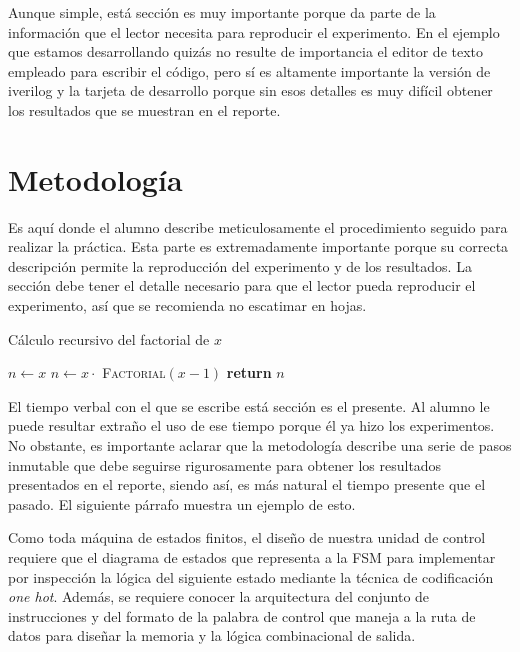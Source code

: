 \documentclass[11pt, twocolumn]{article}
\begin{document}
Aunque simple, está sección es muy importante porque da parte de la información que el lector necesita para reproducir el experimento. En el ejemplo que estamos desarrollando quizás no resulte de importancia el editor de texto empleado para escribir el código, pero sí es altamente importante la versión de iverilog y la tarjeta de desarrollo porque sin esos detalles es muy difícil obtener los resultados que se muestran en el reporte.

\section{Metodología}\label{sec:methodology}

Es aquí donde el alumno describe meticulosamente el procedimiento seguido para realizar la práctica. Esta parte es extremadamente importante porque su correcta descripción permite la reproducción del experimento y de los resultados. La sección debe tener el detalle necesario para que el lector pueda reproducir el experimento, así que se recomienda no escatimar en hojas.

\begin{center}
    \begin{minipage}{0.4\textwidth}
        \begin{algorithm}[H]
            \caption{Cálculo recursivo del factorial de $x$}\label{alg:factorial}
            \begin{algorithmic}[1]
                    \State $n \gets x$
                \Else
                    \State $n \gets x \cdot $ \textsc{Factorial}$(x-1)$
                \EndIf
                \State \textbf{return} $n$
                \EndProcedure
            \end{algorithmic}
        \end{algorithm}
    \end{minipage}
\end{center}

El tiempo verbal con el que se escribe está sección es el presente. Al alumno le puede resultar extraño el uso de ese tiempo porque él ya hizo los experimentos. No obstante, es importante aclarar que la metodología describe una serie de pasos inmutable que debe seguirse rigurosamente para obtener los resultados presentados en el reporte, siendo así, es más natural el tiempo presente que el pasado. El siguiente párrafo muestra un ejemplo de esto.

Como toda máquina de estados finitos, el diseño de nuestra unidad de control requiere que el diagrama de estados que representa a la FSM para implementar por inspección la lógica del siguiente estado mediante la técnica de codificación \textit{one hot}. Además, se requiere conocer la arquitectura del conjunto de instrucciones y del formato de la palabra de control que maneja a la ruta de datos para diseñar la memoria y la lógica combinacional de salida.
\end{document}
